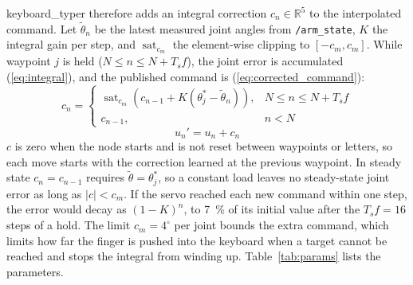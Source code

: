 \documentclass[letterpaper, 10 pt, conference]{ieeeconf}
\begin{document}
keyboard\_typer therefore adds an integral correction $c_n \in \mathbb{R}^5$ to the interpolated command.
Let $\tilde{\theta}_n$ be the latest measured joint angles from \texttt{/arm\_state}, $K$ the integral gain
per step, and $\operatorname{sat}_{c_m}$ the element-wise clipping to $[-c_m, c_m]$. While waypoint $j$ is
held ($N \le n \le N + T_s f$), the joint error is accumulated (\ref{eq:integral}), and the published
command is (\ref{eq:corrected_command}):
\begin{equation}
c_n =
\begin{cases}
\operatorname{sat}_{c_m}( c_{n-1} + K ( \theta_j^{*} - \tilde{\theta}_n ) ), & N \le n \le N + T_s f \\
c_{n-1}, & n < N
\end{cases}
\label{eq:integral}
\end{equation}
\begin{equation}
u_n' = u_n + c_n
\label{eq:corrected_command}
\end{equation}
$c$ is zero when the node starts and is not reset between waypoints or letters, so each move starts with the
correction learned at the previous waypoint. In steady state $c_n = c_{n-1}$ requires
$\tilde{\theta} = \theta_j^{*}$, so a constant load leaves no steady-state joint error as long as
$\lvert c \rvert < c_m$. If the servo reached each new command within one step, the error would decay as
$(1-K)^n$, to 7~\% of its initial value after the $T_s f = 16$ steps of a hold. The limit $c_m = 4^\circ$ per
joint bounds the extra command, which limits how far the finger is pushed into the keyboard when a target
cannot be reached and stops the integral from winding up. Table~\ref{tab:params} lists the parameters.
\end{document}

